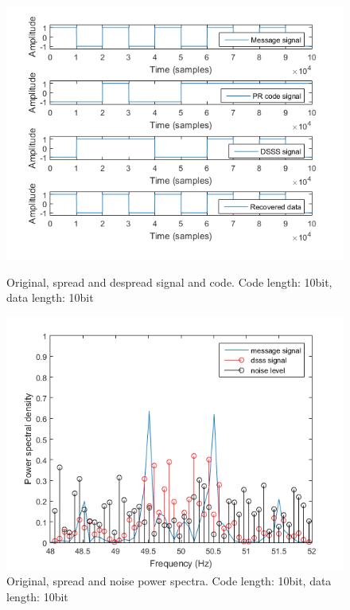 \documentclass[12pt,a4paper]{article}
\begin{document}
		
	\begin{figure}
		\includegraphics[width=\textwidth]{images/code_cl10_dl10.png}
		\caption{Original, spread and despread signal and code. Code length: 10bit, data length: 10bit}
		\label{10:10}
		
		\includegraphics[width=\textwidth]{images/ft_cl_10_dl10.png}
		\caption{Original, spread and noise power spectra. Code length: 10bit, data length: 10bit}
		\label{ft:10:10}
	\end{figure}
\end{document}
